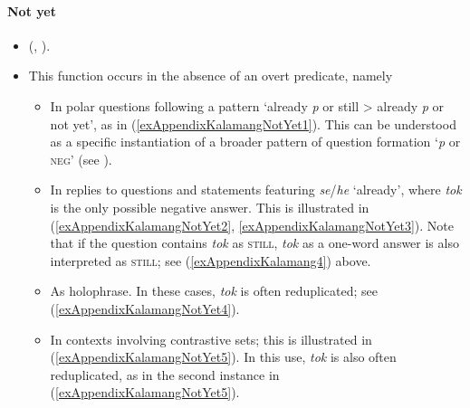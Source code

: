 \paragraph{Not yet}\label{appendixKalamangNotYet}
\begin{itemize}
	\item \citeauthor{VisserKalamangDictionary} (\citeyear*{VisserKalamangDictionary}, \citeyear*[355–356]{Visser2022}).
	\item This function occurs in the absence of an overt predicate, namely 
	\begin{itemize}
		\item In polar questions following a pattern \lq already \textit{p} or still > already \textit{p} or not yet', as in (\ref{exAppendixKalamangNotYet1}). This can be understood as a specific instantiation of a broader pattern of question formation \lq \textit{p} or \textsc{neg}' (see \cite[301–302]{Visser2022}).
		\item In replies to questions and statements featuring \textit{se}/\textit{he} \lq already', where \textit{tok} is the only possible negative answer. This is illustrated in (\ref{exAppendixKalamangNotYet2}, \ref{exAppendixKalamangNotYet3}). Note that if the question contains \textit{tok} as \textsc{still}, \textit{tok} as a one-word answer is also interpreted as \textsc{still}; see (\ref{exAppendixKalamang4}) above.
		\item As holophrase. In these cases, \textit{tok} is often reduplicated; see (\ref{exAppendixKalamangNotYet4}).
		\pagebreak
		\item In contexts involving contrastive sets; this is illustrated in (\ref{exAppendixKalamangNotYet5}). In this use, \textit{tok} is also often reduplicated, as in the second instance in (\ref{exAppendixKalamangNotYet5}).
	\end{itemize}
\end{itemize}
	
